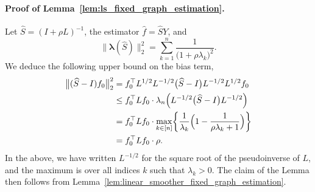 \documentclass[twoside]{article}
\newcommand{\1}{\mathbf{1}}
\newcommand{\lambdavec}{\boldsymbol{\lambda}}
\newcommand{\Lap}{L}
\newcommand{\Id}{I}
\newcommand{\wh}[1]{\widehat{#1}}
\theoremstyle{definition}
\theoremstyle{remark}
\begin{document}
\paragraph{Proof of Lemma~\ref{lem:ls_fixed_graph_estimation}.}
Let $\wh{S} = (\Id + \rho \Lap)^{-1}$, the estimator $\wh{f} = \wh{S}Y$, and
\begin{equation*}
\bigl\|\lambdavec(\wh{S})\bigr\|_2^2 = \sum_{k = 1}^{n} \frac{1}{\bigl(1 + \rho \lambda_k\bigr)^2}.
\end{equation*} 
We deduce the following upper bound on the bias term,
\begin{equation*}
\begin{aligned}
\bigl\|(\wh{S} - I)f_0\bigr\|_2^2 & = f_0^{\top} \Lap^{1/2} \Lap^{-1/2}\bigl(\wh{S} - \Id\bigr) \Lap^{-1/2} \Lap^{1/2} f_0 \\
& \leq f_0^{\top} \Lap f_0 \cdot \lambda_n\Bigl(\Lap^{-1/2}\bigl(\wh{S} - \Id\bigr)\Lap^{-1/2}\Bigr) \\
& = f_0^{\top} \Lap f_0 \cdot \max_{k \in [n]} \biggl\{\frac{1}{\lambda_k} \Bigl(1 - \frac{1}{\rho\lambda_k + 1}\Bigr) \biggr\} \\
& = f_0^{\top} \Lap f_0 \cdot \rho.
\end{aligned}
\end{equation*} 
In the above, we have written $\Lap^{-1/2}$ for the square root of the pseudoinverse of $\Lap$, and the maximum is over all indices $k$ such that $\lambda_k > 0$. The claim of the Lemma then follows from Lemma~\ref{lem:linear_smoother_fixed_graph_estimation}.
\end{document}
